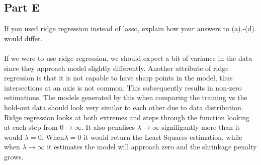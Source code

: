 \documentclass[12pt]{article}
\begin{document}
\subsection{Part E}
If you used ridge regression instead of lasso, explain how your answers to (a).-(d). would differ. \\\\
If we were to use ridge regression, we should expect a bit of variance in the data since they approach model slightly differently. Another attribute of ridge regression is that it is not capable to have sharp points in the model, thus intersections at an axis is not common. This subsequently results in non-zero estimations. The models generated by this when comparing the training vs the hold-out data should look very similar to each other due to data distribution. Ridge regression looks at both extremes and steps through the function looking at each step from $0\rightarrow\infty$. It also penalises $\lambda\rightarrow\infty$ signifigantly more than it would $\lambda = 0$. When$\lambda = 0$ it would return the Least Squares estimation, while when $\lambda\rightarrow\infty$ it estimates the model will approach zero and the shrinkage penalty grows.
\end{document}
